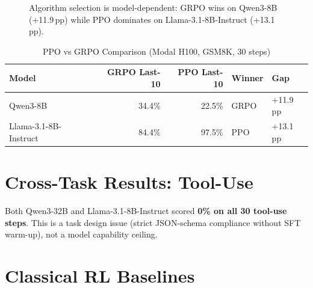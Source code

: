 \documentclass[12pt,a4paper]{report}
\theoremstyle{definition}
\begin{document}
\begin{figure}[htbp]
\centering
{}
\caption{Algorithm selection is model-dependent: GRPO wins on Qwen3-8B (+11.9\,pp) while PPO dominates on Llama-3.1-8B-Instruct (+13.1\,pp).}
\label{fig:ppo-vs-grpo}
\end{figure}


\begin{table}[htbp]
\centering
\caption{PPO vs GRPO Comparison (Modal H100, GSM8K, 30 steps)}
\label{tab:ppo-grpo}
\begin{tabular}{lrrll}
\toprule
\textbf{Model} & \textbf{GRPO Last-10} & \textbf{PPO Last-10} & \textbf{Winner} & \textbf{Gap} \\
\midrule
Qwen3-8B & 34.4\% & 22.5\% & GRPO & +11.9\,pp \\
Llama-3.1-8B-Instruct & 84.4\% & 97.5\% & PPO & +13.1\,pp \\
\bottomrule
\end{tabular}
\end{table}

\section{Cross-Task Results: Tool-Use}
\label{sec:tool-use}

Both Qwen3-32B and Llama-3.1-8B-Instruct scored \textbf{0\% on all 30 tool-use steps}. This is a task design issue
(strict JSON-schema compliance without SFT warm-up), not a model capability ceiling.

\section{Classical RL Baselines}
\label{sec:classical-baselines}
\end{document}
